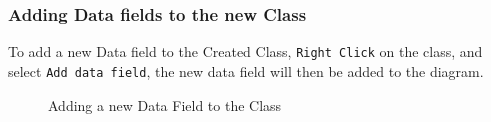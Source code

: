 \documentclass[a4paper]{article}
\begin{document}
{\subsubsection{Adding Data fields to the new Class}
To add a new Data field to the Created Class, \texttt{Right Click} on the class, and select \texttt{Add data field}, the new data field will then be added to the diagram.
\begin{figure}[H]
\begin{center}
 \imagespace
{}
\caption{Adding a new Data Field to the Class}
\end{center}
\end{figure}

}
\end{document}
